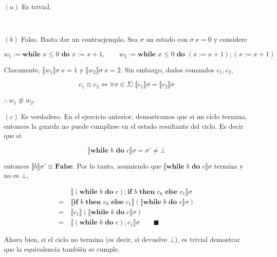 \documentclass[a4paper, 12pt]{article}
\begin{document}
$(a)$ Es trivial.

~ 

$(b)$ Falso. Basta dar un contraejemplo. Sea $\sigma$ un estado con $\sigma ~ x
= 0$ y considere 

\begin{equation*}
  w_1 := \textbf{while } x \leq 0 \textbf{ do } x := x + 1, \qquad w_2 :=
  \textbf{while } x \leq 0 \textbf{ do } ( x := x + 1 );(x := x + 1)
\end{equation*}

Claramente, $\llbracket w_1 \rrbracket\sigma ~ x = 1$ y $\llbracket w_2
\rrbracket\sigma ~ x = 2$. Sin embargo, dados comandos $c_1,c_2$,

\begin{equation*}
  c_1 \equiv c_2 \iff \forall \sigma \in \Sigma: \llbracket c_1 \rrbracket\sigma = \llbracket c_2
  \rrbracket\sigma
\end{equation*}

$\therefore ~ w_1 \not\equiv w_2$. 

$(c)$ Es verdadero. En el ejercicio anterior, demostramos que si un ciclo termina, entonces la
guarda no puede cumplirse en el estado resultante del ciclo. Es decir que si 

\begin{equation*}
  \llbracket \textbf{while } b \textbf{ do } c \rrbracket\sigma = \sigma' \neq
  \bot 
\end{equation*}

entonces $\llbracket b \rrbracket \sigma' \equiv
\textbf{False}$. Por lo tanto, asumiendo que $\llbracket \textbf{while } b
\textbf{ do } c \rrbracket\sigma$ termina y no es $\bot $,

\begin{align*}
  &\llbracket ( \textbf{while } b \textbf{ do } c );\textbf{if } b \textbf{ then
  } c_0 \textbf{ else } c_1 \rrbracket\sigma \\ 
  =~&\llbracket \textbf{if } b \textbf{ then } c_0 \textbf{ else } c_1
  \rrbracket\left( \llbracket \textbf{while } b \textbf{ do } c \rrbracket\sigma
  \right) \\ 
  =~&\llbracket c_1 \rrbracket \left( \llbracket \textbf{while } b \textbf{ do }
   c \rrbracket\sigma \right)  \\ 
  = ~ &\llbracket ( \textbf{while } b \textbf{ do } c );c_1 \rrbracket\sigma \qquad
  \blacksquare
\end{align*}

Ahora bien, si el ciclo no termina (es decir, si devuelve $\bot$), es trivial
demostrar que la equivalencia también se cumple.
\end{document}
